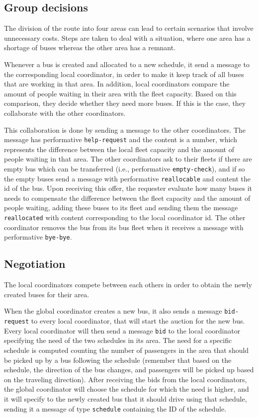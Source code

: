 \subsection{Group decisions}

The division of the route into four areas can lead to certain scenarios that involve unnecessary costs. Steps are taken to deal with a situation, where one area has a shortage of buses whereas the other area has a remnant. 

Whenever a bus is created and allocated to a new schedule, it send a message to the corresponding local coordinator, in order to make it keep track of all buses that are working in that area. In addition, local coordinators compare the amount of people waiting in their area with the fleet capacity. Based on this comparison, they decide whether they need more buses. If this is the case, they collaborate with the other coordinators. 

This collaboration is done by sending a message to the other coordinators. The message has performative \texttt{help-request} and the content is a number, which represents the difference between the local fleet capacity and the amount of people waiting in that area. The other coordinators ask to their fleets if there are empty bus which can be transferred (i.e., performative \texttt{empty-check}), and if so the empty buses send a message with performative \texttt{reallocable} and content the id of the bus. Upon receiving this offer, the requester evaluate how many buses it needs to compensate the difference between the fleet capacity and the amount of people waiting, adding these buses to its fleet and sending them the message \texttt{reallocated} with content corresponding to the local coordinator id. The other coordinator removes the bus from its bus fleet when it receives a message with performative \texttt{bye-bye}.

\subsection{Negotiation}
\label{subsec:negotiations}

The local coordinators compete between each others in order to obtain the newly created buses for their area.

When the global coordinator creates a new bus, it also sends a message \texttt{bid-request} to every local coordinator, that will start the auction for the new bus. Every local coordinator will then send a message \texttt{bid} to the local coordinator specifying the need of the two schedules in its area. The need for a specific schedule is computed counting the number of passengers in the area that should be picked up by a bus following the schedule (remember that based on the schedule, the direction of the bus changes, and passengers will be picked up based on the traveling direction). After receiving the bids from the local coordinators, the global coordinator will choose the schedule for which the need is higher, and it will specify to the newly created bus that it should drive using that schedule, sending it a message of type \texttt{schedule} containing the ID of the schedule.

